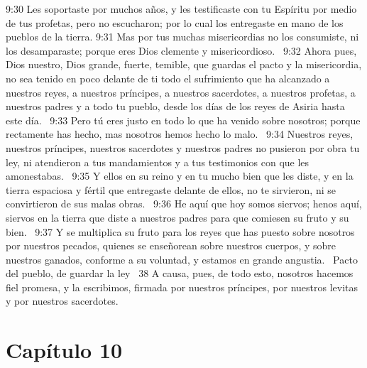 9:30 Les soportaste por muchos años, y les testificaste con tu Espíritu por medio de tus profetas, pero no escucharon; por lo cual los entregaste en mano de los pueblos de la tierra. 
9:31 Mas por tus muchas misericordias no los consumiste, ni los desamparaste; porque eres Dios clemente y misericordioso.  
9:32 Ahora pues, Dios nuestro, Dios grande, fuerte, temible, que guardas el pacto y la misericordia, no sea tenido en poco delante de ti todo el sufrimiento que ha alcanzado a nuestros reyes, a nuestros príncipes, a nuestros sacerdotes, a nuestros profetas, a nuestros padres y a todo tu pueblo, desde los días de los reyes de Asiria hasta este día.  
9:33 Pero tú eres justo en todo lo que ha venido sobre nosotros; porque rectamente has hecho, mas nosotros hemos hecho lo malo.  
9:34 Nuestros reyes, nuestros príncipes, nuestros sacerdotes y nuestros padres no pusieron por obra tu ley, ni atendieron a tus mandamientos y a tus testimonios con que les amonestabas.  
9:35 Y ellos en su reino y en tu mucho bien que les diste, y en la tierra espaciosa y fértil que entregaste delante de ellos, no te sirvieron, ni se convirtieron de sus malas obras.  
9:36 He aquí que hoy somos siervos; henos aquí, siervos en la tierra que diste a nuestros padres para que comiesen su fruto y su bien.  
9:37 Y se multiplica su fruto para los reyes que has puesto sobre nosotros por nuestros pecados, quienes se enseñorean sobre nuestros cuerpos, y sobre nuestros ganados, conforme a su voluntad, y estamos en grande angustia.  
Pacto del pueblo, de guardar la ley  
38 A causa, pues, de todo esto, nosotros hacemos fiel promesa, y la escribimos, firmada por nuestros príncipes, por nuestros levitas y por nuestros sacerdotes.  
\section*{Capítulo 10 }

